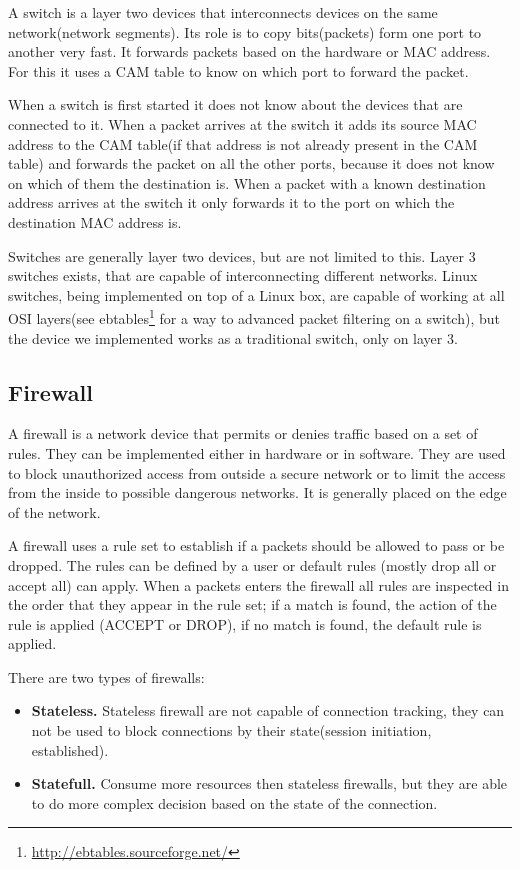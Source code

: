 A switch is a layer two devices that interconnects devices on the same network(network segments). Its role is 
to copy bits(packets) form one port to another very fast. It forwards packets based on the hardware or MAC address. 
For this it uses a CAM table to know on which port to forward the packet. 

When a switch is first started it does not know about the devices that are connected to it. When a packet arrives
at the switch it adds its source MAC address to the CAM table(if that address is not already present in the CAM table) 
and forwards the packet on all the other ports, because
it does not know on which of them the destination is. When a packet with a known destination address arrives at the
switch it only forwards it to the port on which the destination MAC address is.

Switches are generally layer two devices, but are not limited to this. Layer 3 switches exists, that are capable of 
interconnecting different networks. Linux switches, being implemented on top of a Linux box, are capable of working
at all OSI layers(see ebtables\footnote{\url{http://ebtables.sourceforge.net/}} for a way to advanced packet filtering
on a switch), but the device we implemented works as a traditional switch, only on layer 3.

\subsection{Firewall}
\label{sub-sec:firewall}

A firewall is a network device that permits or denies traffic based on a set of rules. They can be implemented either in
hardware or in software. They are used to block unauthorized access from outside a secure network or to limit the access
from the inside to possible dangerous networks. It is generally placed on the edge of the network.

A firewall uses a rule set to establish if a packets should be allowed to pass or be dropped. The rules can be defined
by a user or default rules (mostly drop all or accept all) can apply. When a packets enters the firewall all rules
are inspected in the order that they appear in the rule set; if a match is found, the action of the rule is applied
(ACCEPT or DROP), if no match is found, the default rule is applied.

There are two types of firewalls:
\begin{itemize}
  \item \textbf{Stateless.} Stateless firewall are not capable of connection tracking, they can not be used to block
connections by their state(session initiation, established). 
  \item \textbf{Statefull.} Consume more resources then stateless firewalls, but they are able to do more complex 
decision based on the state of the connection.
\end{itemize} 

